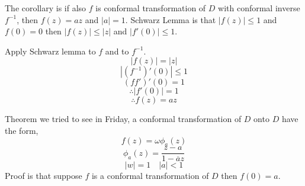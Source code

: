 \documentclass[letter]{article}
\title{}
\author{Ahmed Saad Sabit, Rice University}
\date{\today}
\begin{document}
\maketitle
The corollary is if also $f$ is conformal transformation of $D$ with conformal inverse $f^{-1}$, then $f(z) = az$ and $|a| = 1$.
Schwarz Lemma is that $|f(z)| \le 1$ and $f(0) = 0$ then $|f(z)| \le |z|$ and $|f'(0)| \le  1$.

Apply Schwarz lemma to $f$ and to $f^{-1}$. 
\[
|f(z)| = |z| 
\]
\[
|(f^{-1})' (0) | \le 1
\] 
\[
	(f f')'(0) = 1
\] 
\[
\therefore |f'(0)| = 1
\] 
\[
\therefore f(z) = az
\]

Theorem we tried to see in Friday, a conformal transformation of $D$ onto $D$ have the form, 
\[
f(z) = \omega \phi_a(z)
\] 
\[
	\phi_a (z) = \frac{z-a}{1- \overline{a} z}
\]
\[
|w| = 1 \quad |a| < 1
\]
Proof is that suppose $f$ is a conformal transformation of $D$ then $f(0) = a$. 

\end{document}
